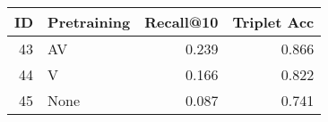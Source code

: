 \begin{tabular}{rlrr}
\toprule
 ID & Pretraining &  Recall@10 &  Triplet Acc \\
\midrule
 43 &          AV &      0.239 &        0.866 \\
 44 &           V &      0.166 &        0.822 \\
 45 &        None &      0.087 &        0.741 \\
\bottomrule
\end{tabular}
